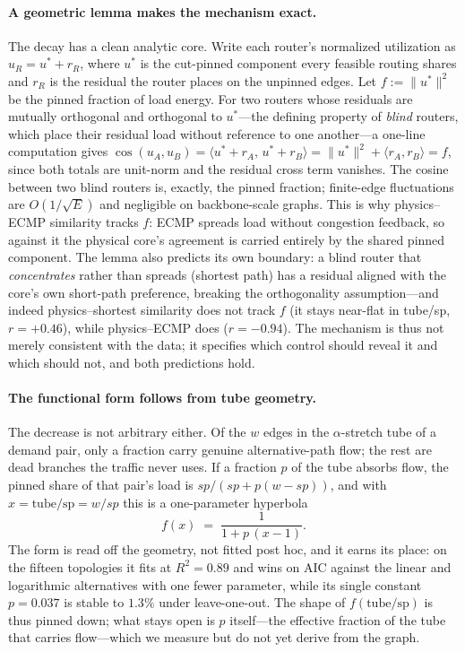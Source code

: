 \paragraph{A geometric lemma makes the mechanism exact.} The decay has a
clean analytic core. Write each router's normalized utilization as
$u_R = u^\ast + r_R$, where $u^\ast$ is the cut-pinned component every
feasible routing shares and $r_R$ is the residual the router places on the
unpinned edges. Let $f := \lVert u^\ast \rVert^2$ be the pinned fraction of
load energy.
For two routers whose residuals are mutually orthogonal and orthogonal to
$u^\ast$---the defining property of \emph{blind} routers, which place their
residual load without reference to one another---a one-line computation gives
$\cos(u_A, u_B) = \langle u^\ast + r_A,\, u^\ast + r_B\rangle = \lVert u^\ast
\rVert^2 + \langle r_A, r_B\rangle = f$, since both totals are unit-norm and the
residual cross term vanishes. The cosine between two blind routers is, exactly,
the pinned fraction; finite-edge fluctuations are $O(1/\sqrt{E})$ and negligible
on backbone-scale graphs. This is why physics--ECMP similarity tracks $f$: ECMP
spreads load without congestion feedback, so against it the physical core's
agreement is carried entirely by the shared pinned component.
 The lemma also predicts its own boundary: a blind router that
\emph{concentrates} rather than spreads (shortest path) has a residual aligned
with the core's own short-path preference, breaking the orthogonality
assumption---and indeed physics--shortest similarity does not track $f$
(it stays near-flat in tube/sp, $r=+0.46$), while physics--ECMP does
($r=-0.94$). The mechanism is thus not merely consistent with the data; it
specifies which control should reveal it and which should not, and both
predictions hold.


\paragraph{The functional form follows from tube geometry.} The decrease is
not arbitrary either. Of the $w$ edges in the $\alpha$-stretch tube of a
demand pair, only a fraction carry genuine alternative-path flow; the rest are
dead branches the traffic never uses. If a fraction $p$ of the tube absorbs
flow, the pinned share of that pair's load is $sp/(sp + p(w-sp))$, and
with $x = \text{tube/sp} = w/sp$ this is a one-parameter hyperbola
\begin{equation}
f(x) \;=\; \frac{1}{1 + p\,(x-1)}.
\end{equation}
The form is read off the geometry, not fitted post hoc, and it earns its place:
on the fifteen topologies it fits at $R^2=0.89$ and wins on AIC against the
linear and logarithmic alternatives with one fewer parameter, while its single
constant $p=0.037$ is stable to $1.3\%$ under leave-one-out. The shape of
$f(\text{tube/sp})$ is thus pinned down; what stays open is $p$ itself---the
effective fraction of the tube that carries flow---which we measure but do not
yet derive from the graph.

